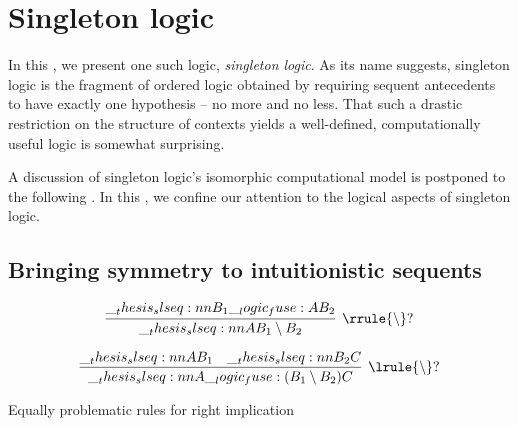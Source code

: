 \chapter{Singleton logic}\label{ch:singleton-logic}



In this , we present one such logic, \emph{singleton logic}.
As its name suggests, singleton logic is the fragment of ordered logic obtained by requiring sequent antecedents to have exactly one hypothesis -- no more and no less.
That such a drastic restriction on the structure of contexts yields a well-defined, computationally useful logic is somewhat surprising.

A discussion of singleton logic's isomorphic computational model is postponed to the following .
In this , we confine our attention to the logical aspects of singleton logic.

\section{Bringing symmetry to intuitionistic sequents}

\begin{equation*}
  \infer[\rrule{\limp}?]{\slseq{A |- B_1 \limp B_2}}{
    \slseq{B_1 \fuse A |- B_2}}
\end{equation*}

\begin{equation*}
  \infer[\lrule{\limp}?]{\slseq{A \fuse (B_1 \limp B_2) |- C}}{
    \slseq{A |- B_1} & \slseq{B_2 |- C}}
\end{equation*}

\begin{marginfigure}
  \caption{Equally problematic rules for right implication}
\end{marginfigure}



